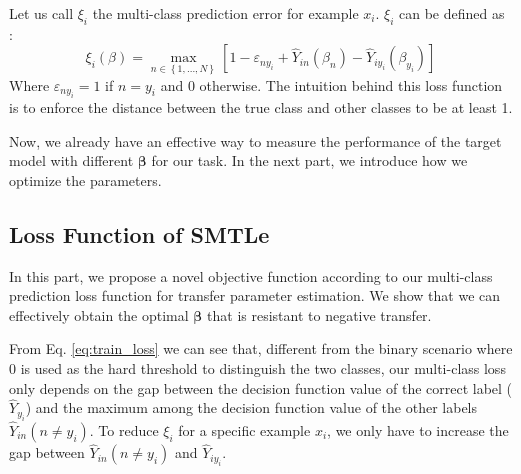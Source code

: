 Let us call $\xi_i$ the multi-class prediction error for example $x_i$. $\xi_i$ can be defined as \cite{crammer2002algorithmic}:
\begin{equation}\label{eq:train_loss}
\xi_i(\beta) = \mathop {\max }\limits_{n \in \left\lbrace 1,...,N \right\rbrace } {\left[ {1 - {\varepsilon _{n{y_i}}} + {{\hat Y}_{in}}\left( {\beta_n } \right) - {{\hat Y}_{i{y_i}}}\left( {\beta_{y_i} } \right)} \right]}
\end{equation}
Where $\varepsilon _{n{y_i}}=1$ if $n=y_i$ and 0 otherwise. The intuition behind this loss function is to enforce the distance between the true class and other classes to be at least 1. 



Now, we already have an effective way to measure the performance of the target model with different $\boldsymbol{\beta}$ for our task. In the next part, we introduce how we optimize the parameters.
\subsection{Loss Function of SMTLe}
In this part, we propose a novel objective function according to our multi-class prediction loss function for transfer parameter estimation. We show that we can effectively obtain the optimal  $\boldsymbol{\beta}$ that is resistant to negative transfer. 
 
From Eq. \eqref{eq:train_loss} we can see that, different from the binary scenario where 0 is used as the hard threshold to distinguish the two classes, our multi-class loss only depends on the gap between the decision function value of the correct label ($\hat Y_{y_i}$) and the maximum among the decision function value of the other labels ${{\hat Y}_{in}}(n \ne y_i)$. To reduce $\xi_i$ for a specific example $x_i$, we only have to increase the gap between ${{\hat Y}_{in}(n \ne y_i)}$ and ${{\hat Y}_{i{y_i}}}$. 


